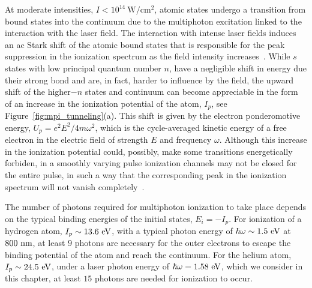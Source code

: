 At moderate intensities, $I < 10^{14}\ \mathrm{W/cm^{2}}$, atomic
states undergo a transition from bound states into the continuum due
to the multiphoton excitation linked to the interaction with the laser
field. The interaction with intense laser fields induces an ac Stark
shift of the atomic bound states that is responsible for the peak
suppression in the ionization spectrum as the field intensity
increases~\cite{MullerStark_1988}. While $s$ states with low principal
quantum number $n$, have a negligible shift in energy due their strong
bond and are, in fact, harder to influence by the field, the upward
shift of the higher$-n$ states and continuum can become appreciable in
the form of an increase in the ionization potential of the atom,
$I_{p}$, see Figure~\ref{fig:mpi_tunneling}(a). This shift is given by
the electron ponderomotive energy, $U_{p} = e^{2}E^{2} /
4m\omega^{2}$, which is the cycle-averaged kinetic energy of a free
electron in the electric field of strength $E$ and frequency
$\omega$. Although this increase in the ionization potential could,
possibly, make some transitions energetically forbiden, in a smoothly
varying pulse ionization channels may not be closed for the entire
pulse, in such a way that the corresponding peak in the ionization
spectrum will not vanish
completely~\cite{Protopapas_mpi_tunneling,Joachain_mpi_tunneling}.

The number of photons required for multiphoton ionization to take
place depends on the typical binding energies of the initial states,
$E_{i} = -I_{p}$. For ionization of a hydrogen atom, $I_{p} \sim
13.6\ \rm{eV}$, with a typical photon energy of $\hbar\omega \sim
1.5\ \rm{eV}$ at $800\ \rm{nm}$, at least $9$ photons are necessary
for the outer electrons to escape the binding potential of the atom
and reach the continuum. For the helium atom, $I_{p} \sim
24.5\ \rm{eV}$, under a laser photon energy of $\hbar\omega =
1.58\ \rm{eV}$, which we consider in this chapter, at least $15$
photons are needed for ionization to occur.

